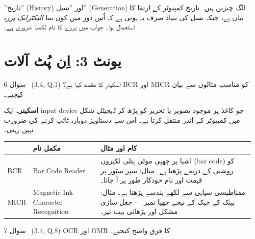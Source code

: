 \begin{ghalti}
''تاریخ'' (\textenglish{History}) اور ''نسل'' (\textenglish{Generation}) الگ
چیزیں ہیں۔ تاریخ کمپیوٹر کے ارتقا کا بیان ہے، جبکہ نسل کی بنیاد صرف یہ ہوتی ہے
کہ اُس دور میں کون سا \emph{الیکٹرانک پرزہ} استعمال ہوا۔ جواب میں پرزے کا نام
لکھنا ضروری ہے۔
\end{ghalti}

\section*{یونٹ \textenglish{3}: اِن پُٹ آلات}

\begin{sawal}{سوال \textenglish{6} \ \textnormal{\small(\textenglish{3.4, Q.1})}}
اسکینر کا مقصد کیا ہے؟ \textenglish{BCR} اور \textenglish{MICR} کو مناسب
مثالوں سے بیان کیجیے۔
\end{sawal}

\begin{hal}
\textbf{اسکینر۔} ایک \textenglish{input device} جو کاغذ پر موجود تصویر یا تحریر
کو پڑھ کر \emph{ڈیجیٹل} شکل میں کمپیوٹر کے اندر منتقل کرتا ہے۔ اس سے دستاویز
دوبارہ ٹائپ کرنے کی ضرورت نہیں رہتی۔

\medskip
\begin{center}
\begin{tabular}{@{}p{2.0cm} p{5.0cm} p{7.4cm}@{}}
\toprule
 & \textbf{مکمل نام} & \textbf{کام اور مثال} \\
\midrule
\textenglish{BCR} & \textenglish{Bar Code Reader}
  & اشیا پر چھپی موٹی پتلی لکیروں (\textenglish{bar code}) کو روشنی کے ذریعے پڑھتا ہے۔ مثال: سپر سٹور پر قیمت اور نام خودکار طور پر آ جانا۔ \\
\textenglish{MICR} & \textenglish{Magnetic Ink Character Recognition}
  & مقناطیسی سیاہی سے لکھے ہندسے پڑھتا ہے۔ مثال: بینک کے چیک کے نیچے چھپا نمبر --- جعل سازی مشکل اور پڑھائی بہت تیز۔ \\
\bottomrule
\end{tabular}
\end{center}

\end{hal}

\begin{sawal}{سوال \textenglish{7} \ \textnormal{\small(\textenglish{3.4, Q.8})}}
\textenglish{OCR} اور \textenglish{OMR} کا فرق واضح کیجیے۔
\end{sawal}

